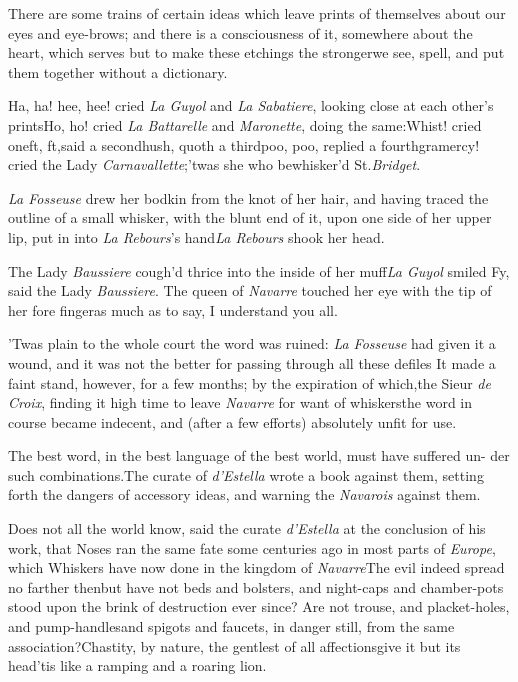\documentclass{article}
\begin{document}
There are some trains of certain ideas which leave prints of
themselves about our eyes and eye-brows; and there is a
consciousness of it, somewhere about the heart, which serves
but to make these etchings the stronger\tsk we see, spell,
and put them together without a dictionary.

Ha, ha! hee, hee! cried \textit{La Guyol} and \textit{La Sabatiere},
looking close at each other’s prints\tsh Ho, ho!
cried \textit{La Battarelle} and \textit{Maronette}, doing the
same:\tsk Whist! cried one\tsk ft, ft,\tsk said a
second\tsk hush, quoth a third\tsk poo, poo, replied a
fourth\tsk gramercy! cried the Lady
\textit{Carnavallette};\tsh ’twas she who
bewhisker’d St.\@ \textit{Bridget}.

\textit{La Fosseuse} drew her bodkin from the knot of her hair,
and having traced the outline of a small whisker, with the blunt
end of it, upon one side of her upper lip, put in into
\textit{La Rebours}’s
hand\tsk \textit{La Rebours} shook her head.

The Lady \textit{Baussiere} cough’d thrice into the inside of her
muff\tsk \textit{La Guyol} smiled\break
\tsk Fy, said the Lady
\textit{Baussiere}. The queen of \textit{Navarre} touched her eye with
the tip of her fore finger\tsk as much as to say, I understand
you all.

’Twas plain to the whole court the word was ruined:
\textit{La Fosseuse} had given it a wound, and it was not
the better for passing through all these defiles\tsk
It\break
made a faint stand, however, for a few months; by the
expiration of which,\break the Sieur \textit{de Croix},
finding it high time to leave \textit{Navarre} for want of
whiskers\tsh the word in course became indecent, and
(after a few efforts) absolutely unfit for use.

The best word, in the best language of the best world, must have
suffered un- der such combinations.\tsh The curate of
\textit{d’Estella} wrote a book against them, setting forth the
dangers of accessory ideas, and warning the \textit{Navarois} against
them.

Does not all the world know, said the curate
\textit{d’Estella} at the conclusion of his work, that Noses
ran the same fate some centuries ago in most parts of
\textit{Europe}, which Whiskers have now done in the kingdom of
\textit{Navarre}\tsk The evil indeed spread no farther
then\tsk but have not beds and bolsters, and night-caps and
chamber-pots stood upon the brink of destruction ever since? Are
not trouse, and placket-holes, and pump-handles\tsk and spigots
and faucets, in danger still, from the same
association?\tsk Chastity, by nature, the gentlest of all
affections\tsk give it but its head\tsk ’tis like
a ramping and a roaring lion.
\end{document}
